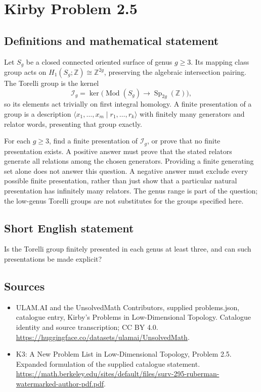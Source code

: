 \documentclass[11pt,a4paper]{article}
\begin{document}
\section*{Kirby Problem 2.5}\label{statement}

\subsection{Definitions and mathematical statement}
Let $S_g$ be a closed connected oriented surface of genus $g\geq3$.
Its mapping class group acts on $H_1(S_g;\mathbb Z)\cong\mathbb Z^{2g}$,
preserving the algebraic intersection pairing. The Torelli group is the kernel
\[
\mathcal I_g=\ker\bigl(\operatorname{Mod}(S_g)
\longrightarrow\operatorname{Sp}_{2g}(\mathbb Z)\bigr),
\]
so its elements act trivially on first integral homology.
A finite presentation of a group is a description
$\langle x_1,\ldots,x_m\mid r_1,\ldots,r_k\rangle$ with finitely many
generators and relator words, presenting that group exactly.

For each $g\geq3$, find a finite presentation of $\mathcal I_g$, or prove that
no finite presentation exists. A positive answer must prove that the stated
relators generate all relations among the chosen generators. Providing a finite
generating set alone does not answer this question. A negative answer must
exclude every possible finite presentation, rather than just show that a
particular natural presentation has infinitely many relators.
The genus range is part of the question; the low-genus Torelli groups are not
substitutes for the groups specified here.
\subsection{Short English statement}
Is the Torelli group finitely presented in each genus at least three, and can such presentations be made explicit?
\subsection{Sources}
\begin{itemize}
\item[S1] ULAM.AI and the UnsolvedMath Contributors, supplied problems.json, catalogue entry, Kirby's Problems in Low-Dimensional Topology. Catalogue identity and source transcription; CC BY 4.0.
\url{https://huggingface.co/datasets/ulamai/UnsolvedMath}.
\item[S2] K3: A New Problem List in Low-Dimensional Topology, Problem 2.5. Expanded formulation of the supplied catalogue statement.
\url{https://math.berkeley.edu/sites/default/files/surv-295-ruberman-watermarked-author-pdf.pdf}.
\end{itemize}
\end{document}
